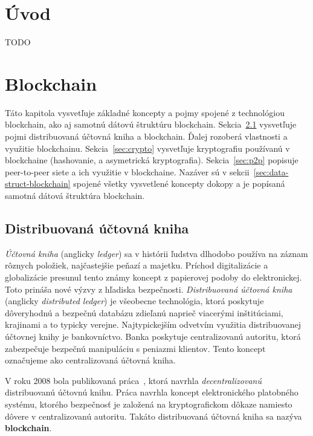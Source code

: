 \chapter{Úvod}
TODO

\chapter{Blockchain}\label{chap:blockchain}

Táto kapitola vysvetľuje základné koncepty a pojmy spojené z technológiou blockchain, ako aj samotnú dátovú štruktúru blockchain. Sekcia~\ref{sec:ladger} vysvetľuje pojmi distribuovaná účtovná kniha a blockchain. Ďalej rozoberá vlastnosti a využitie blockchainu. Sekcia~\ref{sec:crypto} vysvetľuje kryptografiu používanú v blockchaine (hashovanie, a asymetrická kryptografia).  Sekcia~\ref{sec:p2p} popisuje peer-to-peer siete a ich využitie v blockchaine. Nazáver sú v sekcii~\ref{sec:data-struct-blockchain} spojené všetky vysvetlené koncepty dokopy a je popísaná samotná dátová štruktúra blockchain.

\section{Distribuovaná účtovná kniha}\label{sec:ladger}
\textit{Účtovná kniha} (anglicky \textit{ledger}) sa v histórii ľudstva dlhodobo používa na záznam rôznych položiek, najčastejšie peňazí a majetku. Príchod digitalizácie a globalizácie presunul tento známy koncept z papierovej podoby do elektronickej. Toto prináša nové výzvy z hľadiska bezpečnosti.
\textit{Distribuovaná účtovná kniha} (anglicky \textit{distributed ledger}) je všeobecne technológia, ktorá poskytuje dôveryhodnú a bezpečnú databázu zdieľanú naprieč viacerými inštitúciami, krajinami a to typicky verejne. Najtypickejším odvetvím využitia distribuovanej účtovnej knihy je bankovníctvo. Banka poskytuje centralizovanú autoritu, ktorá zabezpečuje bezpečnú manipuláciu s peniazmi klientov. Tento koncept označujeme ako centralizovaná účtovná kniha.~\cite{dltUkReport}

V roku 2008 bola publikovaná práca~\cite{satoshiBitcoin}, ktorá navrhla \textit{decentralizovanú} distribuovanú účtovnú knihu. Práca navrhla koncept elektronického platobného systému, ktorého bezpečnosť je založená na kryptografickom dôkaze namiesto dôvere v centralizovanú autoritu. Takáto distribuovaná účtovná kniha sa nazýva \textbf{blockchain}.

